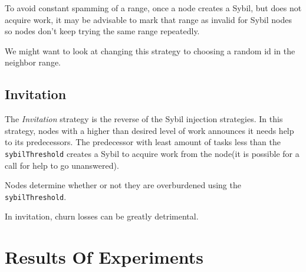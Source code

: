 To avoid constant spamming of a range, once a node creates a Sybil, but does not acquire work, it may be advisable to mark that range as invalid for Sybil nodes so nodes don't keep trying the same range repeatedly. 

We might want to look at changing this strategy to choosing a random id in the neighbor range.


\subsection{Invitation}
The \textit{Invitation }strategy is the reverse of the Sybil injection strategies.
In  this strategy, nodes with a higher than desired level of work announces it needs help to its predecessors.
The predecessor with least amount of tasks less than the \texttt{sybilThreshold} creates a Sybil to acquire work from the node(it is possible for a call for help to go unanswered).

Nodes determine whether or not they are overburdened using the \texttt{sybilThreshold}.

In invitation, churn losses can be greatly detrimental.

\section{Results Of Experiments}
\label{sec:autonomous-results}

